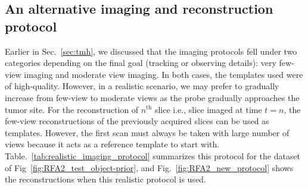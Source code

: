 \documentclass[journal]{IEEEtran}
\begin{document}
\subsection{\textbf{An alternative imaging and reconstruction protocol}}
Earlier in Sec.~\ref{sec:tmh}, we discussed that the imaging protocols fell under two categories depending on the final goal (tracking or observing details): very few-view imaging and moderate view imaging. In both cases, the templates used were of high-quality. However, in a realistic scenario,  we may prefer to gradually increase from few-view to moderate views as the probe gradually approaches the tumor site. For the reconstruction of $n^{\textrm{th}}$ slice i.e., slice imaged at time $t=n$, the few-view reconstructions of the previously acquired slices can be used as templates. However, the first scan must always be taken with large number of views because it acts as a reference template to start with. Table.~\ref{tab:realistic_imaging_protocol} summarizes this protocol for the dataset of Fig~\ref{fig:RFA2_test_object-prior}, and Fig.~\ref{fig:RFA2_new_protocol} shows the reconstructions when this realistic protocol is used.
\end{document}

